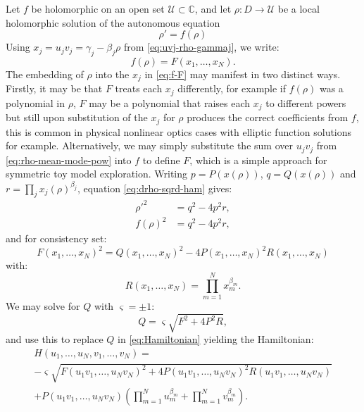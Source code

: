 \documentclass[11pt,a4paper]{article}
\numberwithin{equation}{section}
\begin{document}
Let $f$ be holomorphic on an open set $\mathcal U\subset\mathbb C$, and let $\rho:D\to\mathcal U$ be a local holomorphic solution of the autonomous equation
\begin{equation}
    \rho' = f(\rho)
\end{equation}
Using $x_j=u_j v_j=\gamma_j-\beta_j\rho$ from \eqref{eq:uvj-rho-gammaj}, we write:
\begin{equation}
    f(\rho) = F(x_1,\dots,x_N). \label{eq:f-F}
\end{equation}
The embedding of $\rho$ into the $x_j$ in \eqref{eq:f-F} may manifest in two distinct ways. 
Firstly, it may be that $F$ treats each $x_j$ differently, for example if $f(\rho)$ was a polynomial in $\rho$, 
$F$ may be a polynomial that raises each $x_j$ to different powers but still upon substitution of the $x_j$ for $\rho$ produces the correct coefficients from $f$, 
this is common in physical nonlinear optics cases with elliptic function solutions for example.
Alternatively, we may simply substitute the sum over $u_j v_j$ from \eqref{eq:rho-mean-mode-pow} into $f$ to define $F$, 
which is a simple approach for symmetric toy model exploration. 
Writing $p=P(x(\rho))$, $q=Q(x(\rho))$ and $r=\prod_jx_j(\rho)^{\beta_j}$, equation \eqref{eq:drho-sqrd-ham} gives:
\begin{align}
    {\rho'}^2 &= q^2 - 4p^2r, \\
    f(\rho)^2 &= q^2 - 4p^2r,
\end{align}
and for consistency set:
\begin{equation}
    F(x_1,\dots,x_N)^2 = Q(x_1,\dots,x_N)^2 - 4P(x_1,\dots,x_N)^2R(x_1,\dots,x_N)
\end{equation}
with:
\begin{equation}
    R(x_1,\dots,x_N) = \prod_{m=1}^{N}x_m^{\beta_m}.
\end{equation}
We may solve for $Q$ with $\varsigma=\pm1$:
\begin{equation}
    Q = \varsigma \sqrt{F^2 + 4P^2R}, \label{eq:Q-F-P-R}
\end{equation}
and use this to replace $Q$ in \eqref{eq:Hamiltonian} yielding the Hamiltonian:
\begin{multline}
    H\left(u_1,\dots, u_N, v_1,\dots, v_N\right) = \\
    - \varsigma \sqrt{F{\left(u_1 v_1, \dots , u_N v_N\right)}^2 + 4 P{\left(u_1 v_1, \dots , u_N v_N\right)}^2R{\left(u_1 v_1, \dots , u_N v_N\right)}} \\
    + P{\left(u_1 v_1, \dots , u_N v_N \right)}\left(\prod_{m=1}^{N} u_{m}^{{\beta}_{m}} + \prod_{m=1}^{N} v_{m}^{{\beta}_{m}}\right).
\end{multline}
\end{document}
